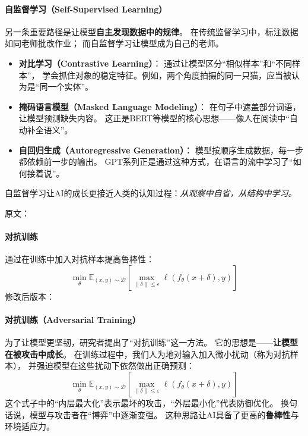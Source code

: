 \paragraph{自监督学习（Self-Supervised Learning）}  
另一条重要路径是让模型\textbf{自主发现数据中的规律}。  
在传统监督学习中，标注数据如同老师批改作业；  
而自监督学习让模型成为自己的老师。  

\begin{itemize}
\item \textbf{对比学习（Contrastive Learning）}：  
  通过让模型区分“相似样本”和“不同样本”，  
  学会抓住对象的稳定特征。例如，两个角度拍摄的同一只猫，应当被认为是“同一个实体”。  

\item \textbf{掩码语言模型（Masked Language Modeling）}：  
  在句子中遮盖部分词语，让模型预测缺失内容。  
  这正是BERT等模型的核心思想——像人在阅读中“自动补全语义”。  

\item \textbf{自回归生成（Autoregressive Generation）}：  
  模型按顺序生成数据，每一步都依赖前一步的输出。  
  GPT系列正是通过这种方式，在语言的流中学习了“如何接着说”。  
\end{itemize}
自监督学习让AI的成长更接近人类的认知过程：\textit{从观察中自省，从结构中学习。}



原文：
\paragraph{对抗训练}
通过在训练中加入对抗样本提高鲁棒性：
$$\min_\theta \mathbb{E}_{(x,y) \sim \mathcal{D}} \left[ \max_{\|\delta\| \leq \varepsilon} \ell(f_\theta(x + \delta), y) \right]$$
修改后版本：
\paragraph{对抗训练（Adversarial Training）}  
为了让模型更坚韧，研究者提出了“对抗训练”这一方法。  
它的思想是——\textbf{让模型在被攻击中成长}。  
在训练过程中，我们人为地对输入加入微小扰动（称为对抗样本），  
并强迫模型在这些扰动下依然做出正确预测：  
$$\min_\theta \mathbb{E}_{(x,y) \sim \mathcal{D}} \left[ \max_{\|\delta\| \leq \varepsilon} \ell(f_\theta(x + \delta), y) \right]$$  
这个式子中的“内层最大化”表示最坏的攻击，“外层最小化”代表防御优化。  
换句话说，模型与攻击者在“博弈”中逐渐变强。  
这种思路让AI具备了更高的\textbf{鲁棒性}与环境适应力。



